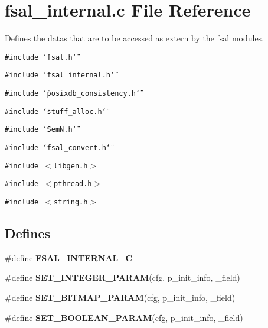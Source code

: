 \section{fsal\_\-internal.c File Reference}
\label{fsal__internal_8c}
Defines the datas that are to be accessed as extern by the fsal modules.  


{\tt \#include \char`\"{}fsal.h\char`\"{}}\par
{\tt \#include \char`\"{}fsal\_\-internal.h\char`\"{}}\par
{\tt \#include \char`\"{}posixdb\_\-consistency.h\char`\"{}}\par
{\tt \#include \char`\"{}stuff\_\-alloc.h\char`\"{}}\par
{\tt \#include \char`\"{}SemN.h\char`\"{}}\par
{\tt \#include \char`\"{}fsal\_\-convert.h\char`\"{}}\par
{\tt \#include $<$libgen.h$>$}\par
{\tt \#include $<$pthread.h$>$}\par
{\tt \#include $<$string.h$>$}\par
\subsection*{Defines}
\begin{CompactItemize}
\item 
\#define \textbf{FSAL\_\-INTERNAL\_\-C}\label{fsal__internal_8c_cfa63689895f5e17e205bd65f0178c0d}

\item 
\#define \textbf{SET\_\-INTEGER\_\-PARAM}(cfg, p\_\-init\_\-info, \_\-field)
\item 
\#define \textbf{SET\_\-BITMAP\_\-PARAM}(cfg, p\_\-init\_\-info, \_\-field)
\item 
\#define \textbf{SET\_\-BOOLEAN\_\-PARAM}(cfg, p\_\-init\_\-info, \_\-field)
\end{CompactItemize}

